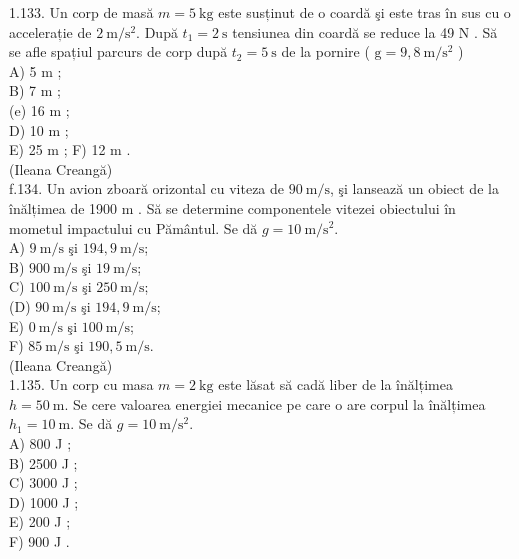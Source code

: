 \documentclass[10pt]{article}
\begin{document}
1.133. Un corp de masă $m=5 \mathrm{~kg}$ este susținut de o coardă şi este tras în sus cu o accelerație de $2 \mathrm{~m} / \mathrm{s}^{2}$. După $t_{1}=2 \mathrm{~s}$ tensiunea din coardă se reduce la 49 N . Să se afle spațiul parcurs de corp după $t_{2}=5 \mathrm{~s}$ de la pornire ( $\mathrm{g}=9,8 \mathrm{~m} / \mathrm{s}^{2}$ )\\
A) 5 m ;\\
B) 7 m ;\\
(e) 16 m ;\\
D) 10 m ;\\
E) 25 m ; F) 12 m .\\
(Ileana Creangă)\\
f.134. Un avion zboară orizontal cu viteza de $90 \mathrm{~m} / \mathrm{s}$, şi lansează un obiect de la înălțimea de 1900 m . Să se determine componentele vitezei obiectului în mometul impactului cu Pământul. Se dă $g=10 \mathrm{~m} / \mathrm{s}^{2}$.\\
A) $9 \mathrm{~m} / \mathrm{s}$ şi $194,9 \mathrm{~m} / \mathrm{s}$;\\
B) $900 \mathrm{~m} / \mathrm{s}$ şi $19 \mathrm{~m} / \mathrm{s}$;\\
C) $100 \mathrm{~m} / \mathrm{s}$ şi $250 \mathrm{~m} / \mathrm{s}$;\\
(D) $90 \mathrm{~m} / \mathrm{s}$ şi $194,9 \mathrm{~m} / \mathrm{s}$;\\
E) $0 \mathrm{~m} / \mathrm{s}$ şi $100 \mathrm{~m} / \mathrm{s}$;\\
F) $85 \mathrm{~m} / \mathrm{s}$ şi $190,5 \mathrm{~m} / \mathrm{s}$.\\
(Ileana Creangă)\\
1.135. Un corp cu masa $m=2 \mathrm{~kg}$ este lăsat să cadă liber de la înălțimea $h=50 \mathrm{~m}$. Se cere valoarea energiei mecanice pe care o are corpul la înălțimea $h_{1}=10 \mathrm{~m}$. Se dă $g=10 \mathrm{~m} / \mathrm{s}^{2}$.\\
A) 800 J ;\\
B) 2500 J ;\\
C) 3000 J ;\\
D) 1000 J ;\\
E) 200 J ;\\
F) 900 J .
\end{document}
